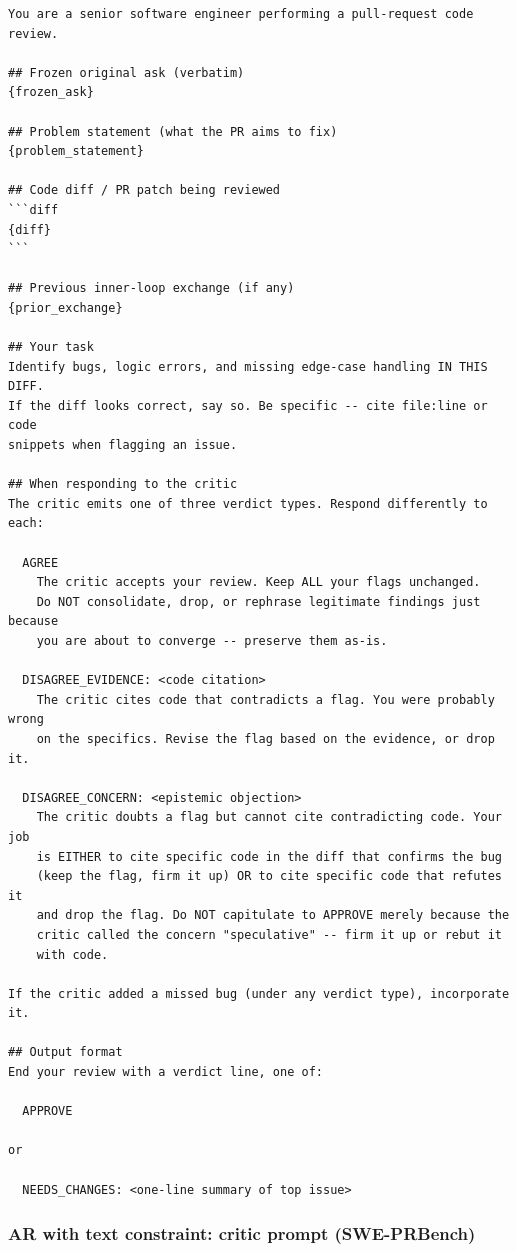 \documentclass{article}
\begin{document}
\begin{footnotesize}
\begin{verbatim}
You are a senior software engineer performing a pull-request code review.

## Frozen original ask (verbatim)
{frozen_ask}

## Problem statement (what the PR aims to fix)
{problem_statement}

## Code diff / PR patch being reviewed
```diff
{diff}
```

## Previous inner-loop exchange (if any)
{prior_exchange}

## Your task
Identify bugs, logic errors, and missing edge-case handling IN THIS DIFF.
If the diff looks correct, say so. Be specific -- cite file:line or code
snippets when flagging an issue.

## When responding to the critic
The critic emits one of three verdict types. Respond differently to each:

  AGREE
    The critic accepts your review. Keep ALL your flags unchanged.
    Do NOT consolidate, drop, or rephrase legitimate findings just because
    you are about to converge -- preserve them as-is.

  DISAGREE_EVIDENCE: <code citation>
    The critic cites code that contradicts a flag. You were probably wrong
    on the specifics. Revise the flag based on the evidence, or drop it.

  DISAGREE_CONCERN: <epistemic objection>
    The critic doubts a flag but cannot cite contradicting code. Your job
    is EITHER to cite specific code in the diff that confirms the bug
    (keep the flag, firm it up) OR to cite specific code that refutes it
    and drop the flag. Do NOT capitulate to APPROVE merely because the
    critic called the concern "speculative" -- firm it up or rebut it
    with code.

If the critic added a missed bug (under any verdict type), incorporate it.

## Output format
End your review with a verdict line, one of:

  APPROVE

or

  NEEDS_CHANGES: <one-line summary of top issue>
\end{verbatim}
\end{footnotesize}

\subsubsection{AR with text constraint: critic prompt (SWE-PRBench)}
\label{app:prompts-prbench-v2-c}
\end{document}
